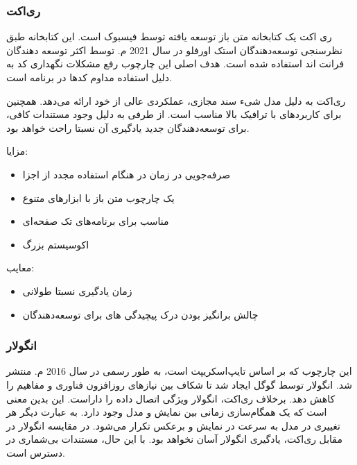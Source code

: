 \newpage


\subsubsection{ری‌اکت}
ری اکت یک کتابخانه متن باز توسعه یافته توسط فیسبوک است. این کتابخانه طبق نظرسنجی توسعه‌دهندگان استک اورفلو در سال 2021 م. توسط اکثر توسعه دهندگان فرانت اند استفاده شده است. هدف اصلی این چارچوب رفع مشکلات نگهداری کد به دلیل استفاده مداوم کدها در برنامه است.


ری‌اکت به دلیل مدل شیء سند مجازی، عملکردی عالی از خود ارائه می‌دهد. همچنین برای کاربردهای با ترافیک بالا مناسب است. از طرفی به دلیل وجود مستندات کافی، برای توسعه‌دهندگان جدید یادگیری آن نسبتا راحت خواهد بود.


مزایا:
\begin{itemize}
    \item صرفه‌جویی در زمان در هنگام استفاده مجدد از اجزا
    \item یک چارچوب متن باز با ابزارهای متنوع
    \item مناسب برای برنامه‌های تک صفحه‌ای
    \item اکوسیستم بزرگ
\end{itemize}

معایب:

\begin{itemize}
    \item زمان یادگیری نسبتا طولانی
    \item چالش برانگیز بودن درک پیچیدگی های  برای توسعه‌دهندگان
\end{itemize}

\newpage

\subsubsection{انگولار}

این چارچوب که بر اساس تایپ‌اسکریپت است، به طور رسمی در سال 2016 م. منتشر شد. انگولار توسط گوگل ایجاد شد تا شکاف بین نیازهای روزافزون فناوری و مفاهیم  را کاهش دهد. برخلاف ری‌اکت، انگولار ویژگی اتصال داده  را داراست. این بدین معنی است که یک همگام‌سازی زمانی بین نمایش و مدل وجود دارد. به عبارت دیگر هر تغییری در مدل به سرعت در نمایش و برعکس تکرار می‌شود. در مقایسه انگولار در مقابل ری‌اکت، یادگیری انگولار آسان نخواهد بود. با این حال، مستندات بی‌شماری در دسترس است.


